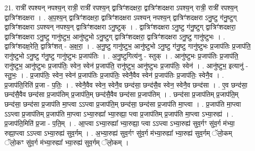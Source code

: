 \documentclass[17pt]{extarticle}
\begin{document}
21. रात्री॑ रपश्यन् नपश्य॒न् रात्री॒ रात्री॑ रपश्य॒न् द्वात्रिꣳ॑शदक्षरा॒ द्वात्रिꣳ॑शदक्षरा ऽपश्य॒न् रात्री॒ रात्री॑ रपश्य॒न् द्वात्रिꣳ॑शदक्षरा । . अ॒प॒श्य॒न् द्वात्रिꣳ॑शदक्षरा॒ द्वात्रिꣳ॑शदक्षरा ऽपश्यन् नपश्य॒न् द्वात्रिꣳ॑शदक्षरा ऽनु॒ष्टु ग॑नु॒ष्टुग् द्वात्रिꣳ॑शदक्षरा ऽपश्यन् नपश्य॒न् द्वात्रिꣳ॑शदक्षरा ऽनु॒ष्टुक् । . द्वात्रिꣳ॑शदक्षरा ऽनु॒ष्टु ग॑नु॒ष्टुग् द्वात्रिꣳ॑शदक्षरा॒ द्वात्रिꣳ॑शदक्षरा ऽनु॒ष्टु गानु॑ष्टुभ॒ आनु॑ष्टुभो ऽनु॒ष्टुग् द्वात्रिꣳ॑शदक्षरा॒ द्वात्रिꣳ॑शदक्षरा ऽनु॒ष्टु गानु॑ष्टुभः । . द्वात्रिꣳ॑शदक्ष॒रेति॒ द्वात्रिꣳ॑शत् - अ॒क्ष॒रा॒ । . अ॒नु॒ष्टु गानु॑ष्टुभ॒ आनु॑ष्टुभो ऽनु॒ष्टु ग॑नु॒ष्टु गानु॑ष्टुभः प्र॒जाप॑तिः प्र॒जाप॑ति॒ रानु॑ष्टुभो ऽनु॒ष्टु ग॑नु॒ष्टु गानु॑ष्टुभः प्र॒जाप॑तिः । . अ॒नु॒ष्टुगित्य॑नु - स्तुक् । . आनु॑ष्टुभः प्र॒जाप॑तिः प्र॒जाप॑ति॒ रानु॑ष्टुभ॒ आनु॑ष्टुभः प्र॒जाप॑तिः॒ स्वेन॒ स्वेन॑ प्र॒जाप॑ति॒ रानु॑ष्टुभ॒ आनु॑ष्टुभः प्र॒जाप॑तिः॒ स्वेन॑ । . आनु॑ष्टुभ॒ इत्यानु॑ - स्तु॒भः॒ । . प्र॒जाप॑तिः॒ स्वेन॒ स्वेन॑ प्र॒जाप॑तिः प्र॒जाप॑तिः॒ स्वेनै॒वैव स्वेन॑ प्र॒जाप॑तिः प्र॒जाप॑तिः॒ स्वेनै॒व । . प्र॒जाप॑ति॒रिति॑ प्र॒जा - प॒तिः॒ । . स्वेनै॒वैव स्वेन॒ स्वेनै॒व छन्द॑सा॒ छन्द॑सै॒व स्वेन॒ स्वेनै॒व छन्द॑सा । . ए॒व छन्द॑सा॒ छन्द॑सै॒वैव छन्द॑सा प्र॒जाप॑तिम् प्र॒जाप॑ति॒म् छन्द॑सै॒वैव छन्द॑सा प्र॒जाप॑तिम् । . छन्द॑सा प्र॒जाप॑तिम् प्र॒जाप॑ति॒म् छन्द॑सा॒ छन्द॑सा प्र॒जाप॑ति मा॒प्त्वा ऽऽप्त्वा प्र॒जाप॑ति॒म् छन्द॑सा॒ छन्द॑सा प्र॒जाप॑ति मा॒प्त्वा । . प्र॒जाप॑ति मा॒प्त्वा ऽऽप्त्वा प्र॒जाप॑तिम् प्र॒जाप॑ति मा॒प्त्वा ऽभ्या॒रुह्या᳚ भ्या॒रुह्या॒ प्त्वा प्र॒जाप॑तिम् प्र॒जाप॑ति मा॒प्त्वा ऽभ्या॒रुह्य॑ । . प्र॒जाप॑ति॒मिति॑ प्र॒जा - प॒ति॒म् । . आ॒प्त्वा ऽभ्या॒रुह्या᳚ भ्या॒रुह्या॒ प्त्वा ऽऽप्त्वा ऽभ्या॒रुह्य॑ सुव॒र्गꣳ सु॑व॒र्ग म॑भ्या॒ रुह्या॒प्त्वा ऽऽप्त्वा ऽभ्या॒रुह्य॑ सुव॒र्गम् । . अ॒भ्या॒रुह्य॑ सुव॒र्गꣳ सु॑व॒र्ग म॑भ्या॒रुह्या᳚ भ्या॒रुह्य॑ सुव॒र्गम् ॅलो॒कम् ॅलो॒कꣳ सु॑व॒र्ग म॑भ्या॒रुह्या᳚ भ्या॒रुह्य॑ सुव॒र्गम् ॅलो॒कम् । \newline
\end{document}
